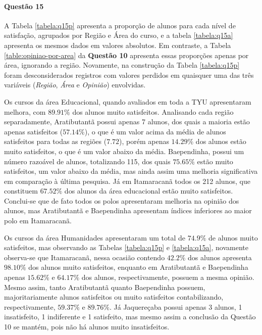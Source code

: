 \documentclass[10pt,a4paper,oneside]{article}
\newcommand{\arat}{Aratibutantã\xspace}
\newcommand{\baep}{Baependinha\xspace}
\newcommand{\itam}{Itamaracanã\xspace}
\newcommand{\jaqu}{Jaquereçaba\xspace}
\newcommand{\adm}{Administração\xspace}
\newcommand{\comp}{Computação e Matemática\xspace}
\newcommand{\edu}{Educacional\xspace}
\newcommand{\hum}{Humanidades\xspace}
\begin{document}
\paragraph{Questão 15}

A Tabela \ref{tabela:q15p} apresenta a proporção de alunos para cada nível de satisfação, agrupados por Região e Área do curso, e a tabela \ref{tabela:q15a} apresenta os mesmos dados em valores absolutos. Em contraste, a Tabela \ref{table:opiniao-por-area} da \textbf{Questão 10} apresenta essas proporções apenas por área, ignorando a região. Novamente, na construção da Tabela \ref{tabela:q15p} foram desconsiderados registros com valores perdidos em quaisquer uma das três variáveis (\textit{Região}, \textit{Área} e \textit{Opinião}) envolvidas. 

Os cursos da área \edu, quando avaliados em toda a TYU apresentaram melhora, com $89.91\%$ dos alunos muito satisfeitos. Analisando cada região separadamente, \arat possui apenas 7 alunos, dos quais a maioria estão apenas satisfeitos ($57.14\%$), o que é um valor acima da média de alunos satisfeitos para todas as regiões ($7.72$), porém apenas $14.29\%$ dos alunos estão muito satisfeitos, o que é um valor abaixo da média. \baep, possui um número razoável de alunos, totalizando 115, dos quais $75.65\%$ estão muito satisfeitos, um valor abaixo da média, mas ainda assim uma melhoria significativa em comparação à última pesquisa. Já em \itam todos os 212 alunos, que constituem $67.52\%$ dos alunos da área educacional estão muito satisfeitos. Conclui-se que de fato todos os polos apresentaram melhoria na opinião dos alunos, mas \arat e \baep apresentam índices inferiores ao maior polo em \itam.

Os cursos da área \hum apresentaram um total de $74.9\%$ de alunos muito satisfeitos, mas observando as Tabelas \ref{tabela:q15p} e \ref{tabela:q15a}, novamente observa-se que \itam, nessa ocasião contendo $42.2\%$ dos alunos apresenta  $98.10\%$ dos alunos muito satisfeitos, enquanto em \arat e \baep apenas $15.62\%$ e $64.17\%$ dos alunos, respectivamente, possuem a mesma opinião. Mesmo assim, tanto \arat quanto \baep possuem, majoritariamente alunos satisfeitos ou muito satisfeitos contabilizando, respectivamente, $59.37\%$ e $89.76\%$. Já \jaqu possui apenas 3 alunos, 1 insatisfeito, 1 indiferente e 1 satisfeito, mas mesmo assim a conclusão da Questão 10 se mantém, pois não há alunos muito insatisfeitos.


\end{document}
